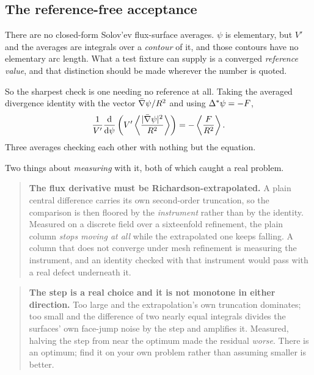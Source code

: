 \subsection{The reference-free acceptance}
\label{sec:identity}

There are no closed-form Solov'ev flux-surface averages. $\psi$ is elementary,
but $V'$ and the averages are integrals over a \emph{contour} of it, and those
contours have no elementary arc length. What a test fixture can supply is a
converged \emph{reference value}, and that distinction should be made wherever
the number is quoted.

So the sharpest check is one needing no reference at all. Taking the averaged
divergence identity with the vector $\bar{\nabla}\psi/R^{2}$ and using
$\Delta^{*}\psi = -F$,
\begin{equation}
	\frac{1}{V'} \frac{\mathrm{d}}{\mathrm{d}\psi}
		\left( V' \left\langle \frac{|\bar{\nabla}\psi|^{2}}{R^{2}} \right\rangle \right)
	= - \left\langle \frac{F}{R^{2}} \right\rangle .
	\label{eq:averaged-gs}
\end{equation}
Three averages checking each other with nothing but the equation.

Two things about \emph{measuring} with it, both of which caught a real problem.

\begin{quote}
	\textbf{The flux derivative must be Richardson-extrapolated.} A plain central
	difference carries its own second-order truncation, so the comparison is then
	floored by the \emph{instrument} rather than by the identity. Measured on a
	discrete field over a sixteenfold refinement, the plain column \emph{stops
	moving at all} while the extrapolated one keeps falling. A column that does
	not converge under mesh refinement is measuring the instrument, and an
	identity checked with that instrument would pass with a real defect
	underneath it.
\end{quote}

\begin{quote}
	\textbf{The step is a real choice and it is not monotone in either
	direction.} Too large and the extrapolation's own truncation dominates; too
	small and the difference of two nearly equal integrals divides the surfaces'
	own face-jump noise by the step and amplifies it. Measured, halving the step
	from near the optimum made the residual \emph{worse}. There is an optimum;
	find it on your own problem rather than assuming smaller is better.
\end{quote}

